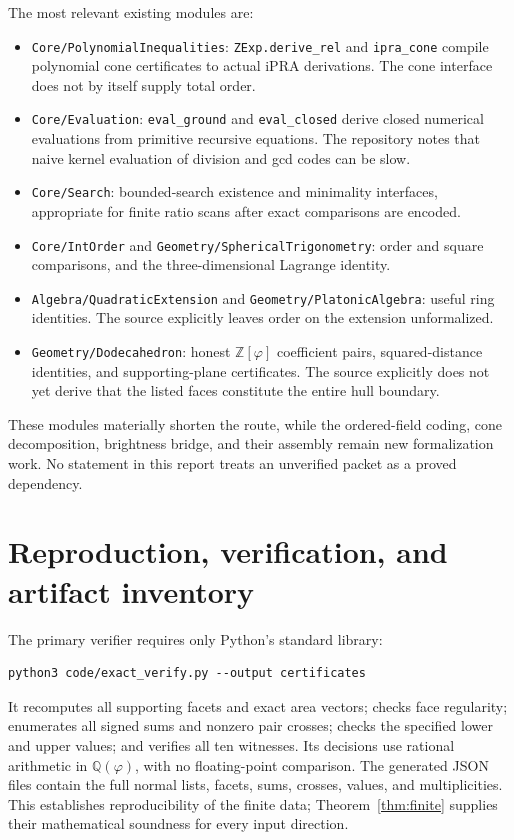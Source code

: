 \documentclass[11pt,a4paper]{article}
\newcommand{\ph}{\varphi}
\newcommand{\Q}{\mathbb Q}
\newcommand{\Z}{\mathbb Z}
\newcommand{\code}[1]{\texttt{#1}}
\begin{document}
The most relevant existing modules are:
\begin{itemize}
\item \code{Core/PolynomialInequalities}: \code{ZExp.derive\_rel} and \code{ipra\_cone} compile polynomial cone certificates to actual iPRA derivations. The cone interface does not by itself supply total order.
\item \code{Core/Evaluation}: \code{eval\_ground} and \code{eval\_closed} derive closed numerical evaluations from primitive recursive equations. The repository notes that naive kernel evaluation of division and gcd codes can be slow.
\item \code{Core/Search}: bounded-search existence and minimality interfaces, appropriate for finite ratio scans after exact comparisons are encoded.
\item \code{Core/IntOrder} and \code{Geometry/SphericalTrigonometry}: order and square comparisons, and the three-dimensional Lagrange identity.
\item \code{Algebra/QuadraticExtension} and \code{Geometry/PlatonicAlgebra}: useful ring identities. The source explicitly leaves order on the extension unformalized.
\item \code{Geometry/Dodecahedron}: honest $\Z[\ph]$ coefficient pairs, squared-distance identities, and supporting-plane certificates. The source explicitly does not yet derive that the listed faces constitute the entire hull boundary.
\end{itemize}
These modules materially shorten the route, while the ordered-field coding, cone decomposition, brightness bridge, and their assembly remain new formalization work. No statement in this report treats an unverified packet as a proved dependency.

\section{Reproduction, verification, and artifact inventory}\label{sec:artifacts}

The primary verifier requires only Python's standard library:
\begin{lstlisting}
python3 code/exact_verify.py --output certificates
\end{lstlisting}
It recomputes all supporting facets and exact area vectors; checks face regularity; enumerates all signed sums and nonzero pair crosses; checks the specified lower and upper values; and verifies all ten witnesses. Its decisions use rational arithmetic in $\Q(\ph)$, with no floating-point comparison. The generated JSON files contain the full normal lists, facets, sums, crosses, values, and multiplicities. This establishes reproducibility of the finite data; Theorem~\ref{thm:finite} supplies their mathematical soundness for every input direction.
\end{document}
